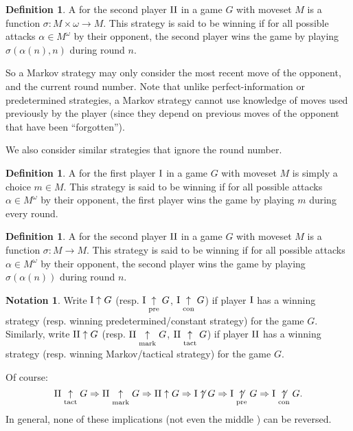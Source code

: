 \documentclass{amsart}
\theoremstyle{plain}
\theoremstyle{definition}
\newtheorem{definition}[theorem]{Definition}
\newtheorem{notation}[theorem]{Notation}
\theoremstyle{remark}
\theoremstyle{plain}
\theoremstyle{definition}
\theoremstyle{remark}
\begin{document}
\begin{definition}
  A  for the second player \(\mathrm{II}\)
  in a game \(G\) with moveset \(M\) is a function
  \(\sigma:M\times\omega\to M\). This strategy is said to be winning if
  for all possible attacks \(\alpha\in M^\omega\) by their opponent,
  the second player wins the game by playing \(\sigma(\alpha(n),n)\)
  during round \(n\).
\end{definition}

So a Markov strategy may only consider the most recent move of the opponent,
and the current round number. Note that unlike perfect-information or
predetermined strategies, a Markov strategy cannot use knowledge of
moves used previously by the player (since they depend on previous moves of
the opponent that have been ``forgotten'').

We also consider similar strategies that ignore the round number.

\begin{definition}
  A  for the first player \(\mathrm{I}\)
  in a game \(G\) with moveset \(M\) is simply a choice \(m\in M\).
  This strategy is said to be winning if
  for all possible attacks \(\alpha\in M^\omega\) by their opponent,
  the first player wins the game by playing \(m\) during every round.
\end{definition}

\begin{definition}
  A  for the second player \(\mathrm{II}\)
  in a game \(G\) with moveset \(M\) is a function
  \(\sigma:M\to M\). This strategy is said to be winning if
  for all possible attacks \(\alpha\in M^\omega\) by their opponent,
  the second player wins the game by playing \(\sigma(\alpha(n))\)
  during round \(n\).
\end{definition}

\begin{notation}
  Write \(\mathrm{I}\uparrow G\) (resp. \(\mathrm{I}\underset{\text{pre}}{\uparrow} G\), \(\mathrm{I}\underset{\text{con}}{\uparrow} G\)) 
  if player \(\mathrm{I}\) has a winning
  strategy (resp. winning predetermined/constant strategy) for the game \(G\). Similarly,
  write \(\mathrm{II}\uparrow G\) (resp. \(\mathrm{II}\underset{\text{mark}}{\uparrow} G\), \(\mathrm{II}\underset{\text{tact}}{\uparrow} G\)) 
  if player \(\mathrm{II}\) has a winning
  strategy (resp. winning Markov/tactical strategy) for the game \(G\).
\end{notation}

Of course: 
\[
  \mathrm{II}\underset{\text{tact}}{\uparrow} G\Rightarrow 
  \mathrm{II}\underset{\text{mark}}{\uparrow} G\Rightarrow 
  \mathrm{II}\uparrow G\Rightarrow 
  \mathrm{I}\not\uparrow G\Rightarrow 
  \mathrm{I}\underset{\text{pre}}{\not\uparrow} G\Rightarrow 
  \mathrm{I}\underset{\text{con}}{\not\uparrow} G
.\]
In general, none of these implications (not even the middle \cite{MR0054922}) can be reversed.
\end{document}
